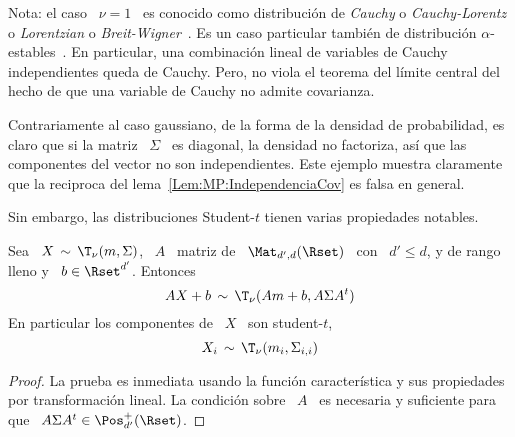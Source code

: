 Nota: el caso  \ $\nu = 1$ \  es conocido como distribuci\'on de  {\em Cauchy} o
{\em  Cauchy-Lorentz} o  {\em Lorentzian}  o  {\em Breit-Wigner}~\cite{Cau53:07,
  Cau53,  Bien53, Bie53:07,  BreWig36, Sti74,  SamTaq94, Lorentz}.   Es  un caso
particular  tambi\'en de  distribuci\'on  $\alpha$-estables~\cite{SamTaq94}.  En
particular, una combinaci\'on lineal de variables de Cauchy independientes queda
de Cauchy. Pero, no  viola el teorema del l\'imite central del  hecho de que una
variable de Cauchy no admite covarianza.

Contrariamente al caso gaussiano, de la forma de la densidad de probabilidad, es
claro que si la matriz \ $\Sigma$ \ es diagonal, la densidad no factoriza, as\'i
que  las componentes  del vector  no son  independientes.  Este  ejemplo muestra
claramente que  la reciproca del lema~\ref{Lem:MP:IndependenciaCov}  es falsa en
general.

Sin embargo, las distribuciones Student-$t$ tienen varias propiedades notables.

\begin{lema}
\label{Lem:MP:StabilidadLinealStudentT}
%
  Sea \ $X \, \sim \,  \T_\nu(m,\Sigma)$, \ $A$ \ matriz de \ $\Mat_{d',d}(\Rset)$
  \ con \ $d' \le d$, y de rango lleno y \ $b \in \Rset^{d'}$. Entonces
  \[
  A X + b\, \sim \, \T_\nu( A m + b , A \Sigma A^t)
  \]
  En particular los componentes de \ $X$ \ son student-$t$,
  \[
  X_i \, \sim \, \T_\nu(m_i , \Sigma_{i,i} )
  \]
\end{lema}
\begin{proof}
  La prueba es inmediata usando  la funci\'on caracter\'istica y sus propiedades
  por  transformaci\'on lineal.  La condici\'on  sobre \  $A$ \  es  necesaria y
  suficiente para que \ $A \Sigma A^t \in \Pos_{d'}^+(\Rset)$.
\end{proof}

